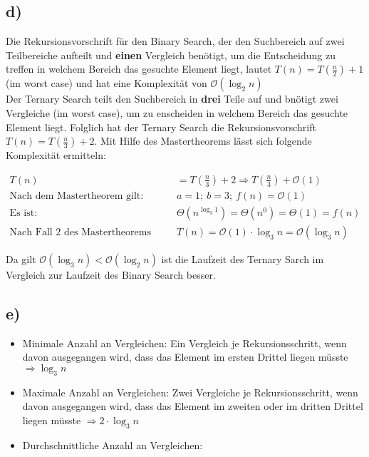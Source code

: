 \documentclass[a4paper]{scrartcl}
\begin{document}
\subsection*{d)}
Die Rekursionsvorschrift für den Binary Search, der den Suchbereich auf zwei Teilbereiche aufteilt und \textbf{einen} Vergleich benötigt, um die Entscheidung zu treffen in welchem Bereich das gesuchte Element liegt, lautet $T(n) = T(\frac{n}{2}) + 1$ (im worst case) und hat eine Komplexität von $\mathcal{O}(\log_2 n)$ \\
Der Ternary Search teilt den Suchbereich in \textbf{drei} Teile auf und bnötigt zwei Vergleiche (im worst case), um zu enscheiden in welchem Bereich das gesuchte Element liegt. Folglich hat der Ternary Search die Rekursionsvorschrift $T(n) = T(\frac{n}{3}) + 2$. 
Mit Hilfe des Mastertheorems lässt sich folgende Komplexität ermitteln:

\begin{align*}
T(n) &= T\left(\frac{n}{3}\right) + 2 \Rightarrow T\left(\frac{n}{3}\right) + \mathcal{O}(1) \\
\text{Nach dem Mastertheorem gilt: } &a = 1; ~ b = 3; ~ f(n) = \mathcal{O}(1) \\
\text{Es ist: } &\Theta(n^{\log_3 1}) = \Theta(n^0) = \Theta(1) = f(n) \\
\text{Nach Fall 2 des Mastertheorems gilt: } &T(n) = \mathcal{O}(1) \cdot \log_3 n = \mathcal{O}(\log_3 n)
\end{align*}

Da gilt $\mathcal{O}(\log_3 n) < \mathcal{O}(\log_2 n)$ ist die Laufzeit des Ternary Sarch im Vergleich zur Laufzeit des Binary Search besser.

\subsection*{e)}
\begin{itemize}
	\item 
	Minimale Anzahl an Vergleichen: Ein Vergleich je Rekursionsschritt, wenn davon ausgegangen wird, dass das Element im ersten Drittel liegen müsste $\Rightarrow \log_3 n$
	
	\item
	Maximale Anzahl an Vergleichen: Zwei Vergleiche je Rekursionsschritt, wenn davon ausgegangen wird, dass das Element im zweiten oder im dritten Drittel liegen müsste $\Rightarrow 2 \cdot \log_3 n$
	
	\item
	Durchschnittliche Anzahl an Vergleichen: 
\end{itemize}
\end{document}
